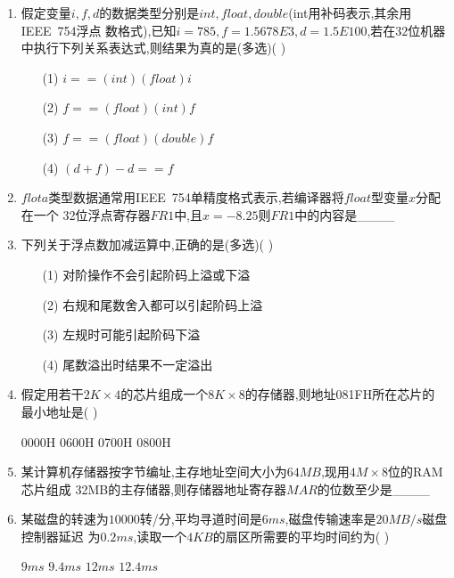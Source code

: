 \documentclass[12pt, a4paper, oneside, UTF8]{ctexbook}
\begin{document}
\begin{enumerate}
    \item \bt 假定变量$i,f,d$的数据类型分别是$int,float,double$(int用补码表示,其余用IEEE\ 754浮点
    数格式),已知$i=785,f=1.5678E3,d=1.5E100$,若在$32$位机器中执行下列关系表达式,则结果为真的是(多选)(   )
    \begin{enumerate}
        \item [(1)] $i==(int)(float)i$ 
        \item [(2)] $f==(float)(int)f$ 
        \item [(3)] $f==(float)(double)f$
        \item [(4)] $(d+f)-d==f$
    \end{enumerate}

    \item \bt $flota$类型数据通常用IEEE\ 754单精度格式表示,若编译器将$float$型变量$x$分配在一个
    32位浮点寄存器$FR1$中,且$x=-8.25$则$FR1$中的内容是\_\_\_\_ 

    \item \bt 下列关于浮点数加减运算中,正确的是(多选)(    )
    \begin{enumerate}
        \item [(1)] 对阶操作不会引起阶码上溢或下溢 
        \item [(2)] 右规和尾数舍入都可以引起阶码上溢 
        \item [(3)] 左规时可能引起阶码下溢 
        \item [(4)] 尾数溢出时结果不一定溢出 
    \end{enumerate}

    \item \bt 假定用若干$2K\times 4$的芯片组成一个$8K\times 8$的存储器,则地址081FH所在芯片的
    最小地址是(    ) 
    \begin{choices}
        \task 0000H
        \task 0600H
        \task 0700H
        \task 0800H
    \end{choices}
    

    \item \bt 某计算机存储器按字节编址,主存地址空间大小为$64MB$,现用$4M\times 8$位的RAM芯片组成
    32MB的主存储器,则存储器地址寄存器$MAR$的位数至少是\_\_\_\_ 

    \item \bt 某磁盘的转速为$10000$转/分,平均寻道时间是$6ms$,磁盘传输速率是$20MB/s$磁盘控制器延迟
    为$0.2ms$,读取一个$4KB$的扇区所需要的平均时间约为(   ) 
    \begin{choices}
        \task $9ms$
        \task $9.4ms$
        \task $12ms$
        \task $12.4ms$
    \end{choices}
    


\end{enumerate}
\end{document}
